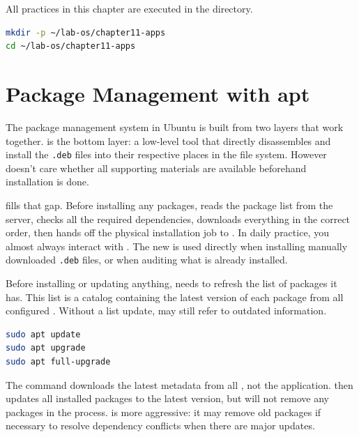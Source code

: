\begin{notebox}
All practices in this chapter are executed in the  directory.
\begin{lstlisting}[language=bash]
mkdir -p ~/lab-os/chapter11-apps
cd ~/lab-os/chapter11-apps
\end{lstlisting}
\end{notebox}

\section{Package Management with apt}
\label{sec:apt-package-management}

The package management system in Ubuntu is built from two layers that work together.
 is the bottom layer: a low-level tool that directly disassembles
and install the \texttt{.deb} files into their respective places in the file system. However
 doesn't care whether all supporting materials are available beforehand
installation is done.

 fills that gap. Before installing any packages, 
reads the package list from the  server, checks all the required dependencies, downloads everything in the correct order, then hands off the physical installation job to . In daily practice, you almost always interact with . The new  is used directly when installing manually downloaded \texttt{.deb} files, or when auditing what is already installed.

Before installing or updating anything,  needs to refresh the list of packages it has. This list is a catalog containing the latest version of each package from all configured . Without a list update,  may still refer to outdated information.

\begin{lstlisting}[language=bash, caption={Updating package and system lists}]
sudo apt update
sudo apt upgrade
sudo apt full-upgrade
\end{lstlisting}

The  command downloads the latest metadata from all , not the application.  then updates all installed packages to the latest version, but will not remove any packages in the process.  is more aggressive: it may remove old packages if necessary to resolve dependency conflicts when there are major updates.

